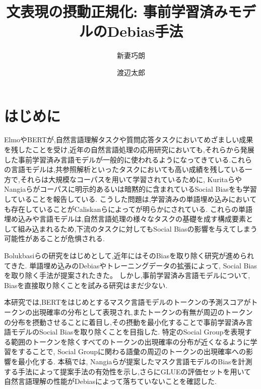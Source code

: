 \documentclass[
  platex, dvipdfmx %
]{nlp2021}
\title{文表現の摂動正規化: 事前学習済みモデルのDebias手法}
\author{新妻巧朗}
\author{渡辺太郎}
\affil{奈良先端科学技術大学院大学 先端科学技術研究科 \\ \texttt{\{niitsuma.takuro.nm3, taro\}@is.naist.jp}}
\begin{document}
\maketitle

\section{はじめに}
Elmo\cite{Peters:2018}やBERT\cite{devlin2018bert}が,自然言語理解タスクや質問応答タスクにおいてめざましい成果を残したことを受け,近年の自然言語処理の応用研究においても,それらから発展した事前学習済み言語モデルが一般的に使われるようになってきている.これらの言語モデルは,共参照解析\cite{joshi2019spanbert}といったタスクにおいても高い成績を残している一方で,それらは大規模なコーパスを用いて学習されているために, Kuritaら\cite{kurita2019measuring}やNangiaら\cite{nangia2020crows}がコーパスに明示的あるいは暗黙的に含まれているSocial Biasをも学習していることを報告している.
こうした問題は,学習済みの単語埋め込みにおいても存在していることがCaliskanら\cite{caliskan2017}によってが明らかにされている.
これらの単語埋め込みや言語モデルは,自然言語処理の様々なタスクの基礎を成す構成要素として組み込まれるため,下流のタスクに対してもSocial Biasの影響を与えてしまう可能性があることが危惧される.

Bolukbasiら\cite{bolukbasi2016man}の研究をはじめとして,近年にはそのBiasを取り除く研究が進められてきた.
単語埋め込みのDebiasやトレーニングデータの拡張によって, Social Biasを取り除く手法\cite{kaneko-bollegala-2019-gender, zhao-etal-2018-gender, lucas2018}が提案されたきた。
しかし,事前学習済み言語モデルについて, Biasを直接取り除くことを試みる研究はまだ少ない.

本研究では,BERTをはじめとするマスク言語モデルのトークンの予測スコアがトークンの出現確率の分布として表現され,またトークンの有無が周辺のトークンの分布を摂動させることに着目し,その摂動を最小化することで事前学習済み言語モデルのSocial Biasを取り除くことを目指した.
特定のSocial Groupを表現する範囲のトークンを除くすべてのトークンの出現確率の分布が近くなるように学習をすることで, Social Groupに関わる語彙の周辺のトークンの出現確率への影響を最小化する.
本稿では, Nangiaら\cite{nangia2020crows}が提案したマスク言語モデルのBiasを計測する手法によって提案手法の有効性を示し,さらにGLUEの評価セットを用いて自然言語理解の性能がDebiasによって落ちていないことを確認した.
\end{document}
